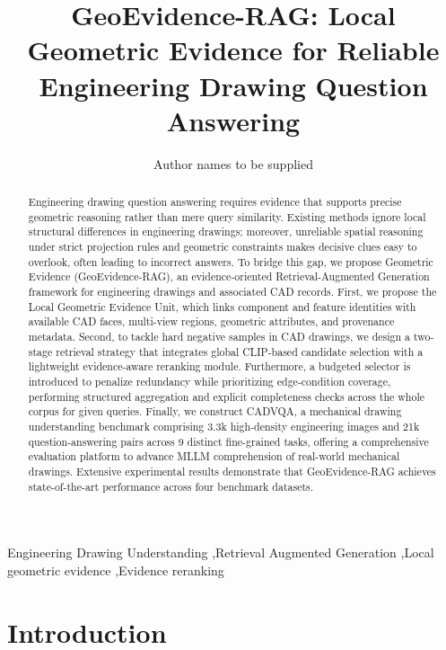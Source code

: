 \documentclass[preprint,12pt]{elsarticle}
\begin{document}
\begin{frontmatter}
\title{GeoEvidence-RAG: Local Geometric Evidence for Reliable Engineering Drawing Question Answering}
\author{Author names to be supplied}
\begin{abstract}
Engineering drawing question answering requires evidence that supports precise geometric reasoning rather than mere query similarity. Existing methods ignore local structural differences in engineering drawings; moreover, unreliable spatial reasoning under strict projection rules and geometric constraints makes decisive clues easy to overlook, often leading to incorrect answers. To bridge this gap, we propose Geometric Evidence (GeoEvidence-RAG), an evidence-oriented Retrieval-Augmented Generation framework for engineering drawings and associated CAD records. First, we propose the Local Geometric Evidence Unit, which links component and feature identities with available CAD faces, multi-view regions, geometric attributes, and provenance metadata. Second, to tackle hard negative samples in CAD drawings, we design a two-stage retrieval strategy that integrates global CLIP-based candidate selection with a lightweight evidence-aware reranking module. Furthermore, a budgeted selector is introduced to penalize redundancy while prioritizing edge-condition coverage, performing structured aggregation and explicit completeness checks across the whole corpus for given queries. Finally, we construct CADVQA, a mechanical drawing understanding benchmark comprising 3.3k high-density engineering images and 21k question-answering pairs across 9 distinct fine-grained tasks, offering a comprehensive evaluation platform to advance MLLM comprehension of real-world mechanical drawings. Extensive experimental results demonstrate that GeoEvidence-RAG achieves state-of-the-art performance across four benchmark datasets.
\end{abstract}
\begin{keyword}
Engineering Drawing Understanding \sep Retrieval Augmented Generation \sep Local geometric evidence \sep Evidence reranking
\end{keyword}
\end{frontmatter}

\section{Introduction}
\label{sec:introduction}
\end{document}

